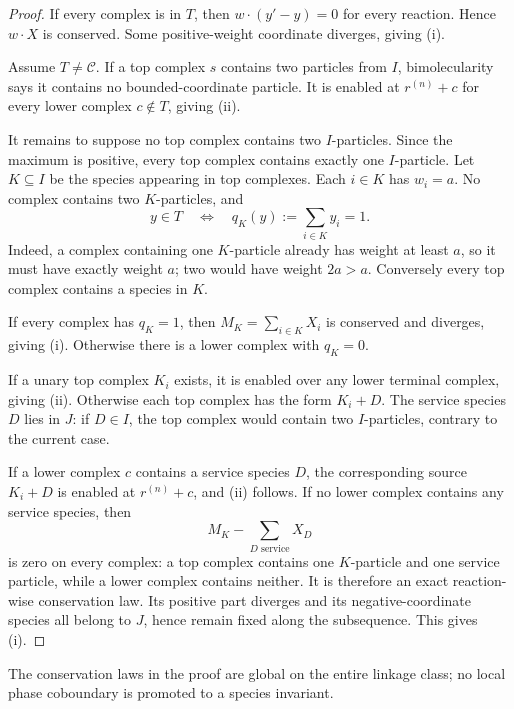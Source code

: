 \documentclass[11pt]{article}
\theoremstyle{definition}
\newcommand{\Ccal}{\mathcal C}
\begin{document}
\begin{proof}
If every complex is in \(T\), then
\(w\cdot(y'-y)=0\) for every reaction.  Hence \(w\cdot X\) is conserved.
Some positive-weight coordinate diverges, giving (i).

Assume \(T\ne\Ccal\).  If a top complex \(s\) contains two particles from
\(I\), bimolecularity says it contains no bounded-coordinate particle.  It
is enabled at \(r^{(n)}+c\) for every lower complex \(c\notin T\), giving
(ii).

It remains to suppose no top complex contains two \(I\)-particles.  Since the
maximum is positive, every top complex contains exactly one \(I\)-particle.
Let \(K\subseteq I\) be the species appearing in top complexes.  Each
\(i\in K\) has \(w_i=a\).  No complex contains two \(K\)-particles, and
\begin{equation}\label{eq:top-qk}
  y\in T\quad\Longleftrightarrow\quad
  q_K(y):=\sum_{i\in K}y_i=1.
\end{equation}
Indeed, a complex containing one \(K\)-particle already has weight at least
\(a\), so it must have exactly weight \(a\); two would have weight \(2a>a\).
Conversely every top complex contains a species in \(K\).

If every complex has \(q_K=1\), then \(M_K=\sum_{i\in K}X_i\) is conserved
and diverges, giving (i).  Otherwise there is a lower complex with
\(q_K=0\).

If a unary top complex \(K_i\) exists, it is enabled over any lower terminal
complex, giving (ii).  Otherwise each top complex has the form \(K_i+D\).
The service species \(D\) lies in \(J\): if \(D\in I\), the top complex would
contain two \(I\)-particles, contrary to the current case.

If a lower complex \(c\) contains a service species \(D\), the corresponding
source \(K_i+D\) is enabled at \(r^{(n)}+c\), and (ii) follows.  If no lower
complex contains any service species, then
\begin{equation}\label{eq:token-law}
  M_K-\sum_{D\text{ service}}X_D
\end{equation}
is zero on every complex: a top complex contains one \(K\)-particle and one
service particle, while a lower complex contains neither.  It is therefore
an exact reaction-wise conservation law.  Its positive part diverges and its
negative-coordinate species all belong to \(J\), hence remain fixed along
the subsequence.  This gives (i).
\end{proof}

The conservation laws in the proof are global on the entire linkage class;
no local phase coboundary is promoted to a species invariant.
\end{document}
